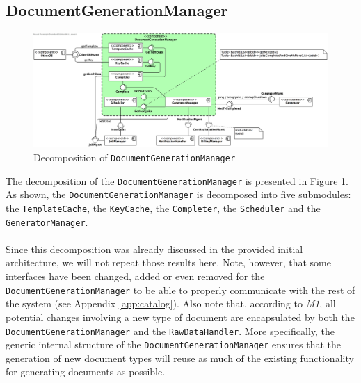 \documentclass[a4paper,10pt]{article}
\begin{document}
\subsection{DocumentGenerationManager}\label{subsec:decomp-DocumentGenerationManager}
\begin{figure}[!htp]
	\centering
	\includegraphics[height=0.9\textheight]{DocumentGenerationManager.png}
	\caption{Decomposition of \texttt{DocumentGenerationManager}}
	\label{fig:decomp-DocumentGenerationManager}
\end{figure}
\FloatBarrier
\noindent
The decomposition of the \texttt{DocumentGenerationManager} is presented in Figure \ref{fig:decomp-DocumentGenerationManager}. As shown, the \texttt{DocumentGenerationManager} is decomposed into five submodules: the \texttt{TemplateCache}, the \texttt{KeyCache}, the \texttt{Completer}, the \texttt{Scheduler} and the \texttt{GeneratorManager}.\\\\
Since this decomposition was already discussed in the provided initial architecture, we will not repeat those results here. Note, however, that some interfaces have been changed, added or even removed for the \texttt{DocumentGenerationManager} to be able to properly communicate with the rest of the system (see Appendix \ref{app:catalog}).
Also note that, according to \textit{M1}, all potential changes involving a new type of document are encapsulated by both the \texttt{DocumentGenerationManager} and the \texttt{RawDataHandler}. More specifically, the generic internal structure of the \texttt{DocumentGenerationManager} ensures that the generation of new document types will reuse as much of the existing functionality for generating documents as possible.
\end{document}
